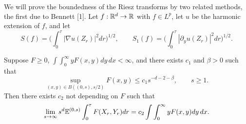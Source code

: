 
We will prove the boundedness of the Riesz transforms by two related methods, the first due to Bennett [1]. Let $f : \mathbb{R}^d \to \mathbb{R}$ with $f \in L^p$, let $u$ be the harmonic extension of $f$, and let
\begin{equation}\label{eq:ch4_3.3}
    S(f) = \Big(\int_0^{\tau} |\nabla u(Z_r)|^2dr\Big)^{1/2}, \qquad S_1(f) = \Big(\int_0^{\tau} |\partial_y u(Z_r)|^2dr\Big)^{1/2}.
\end{equation}

\begin{lemma}\label{lem:ch4_3.2}
Suppose $F \geq 0$, $\int\int_0^{\infty} yF(x,y)dy\,dx < \infty$, and there exists $c_1$ and $\beta > 0$ such that
\[\sup_{(x,y)\in B((0,s),s/2)} F(x,y) \leq c_1s^{-d-2-\beta}, \qquad s \geq 1.\]
Then there exists $c_2$ not depending on $F$ such that
\begin{equation}\label{eq:ch4_3.4}
    \lim_{s\to\infty} s^d\mathbb{E}^{(0,s)} \int_0^{\tau} F(X_r,Y_r)dr = c_2\int\int_0^{\infty} yF(x,y)dy\,dx.
\end{equation}
\end{lemma}

